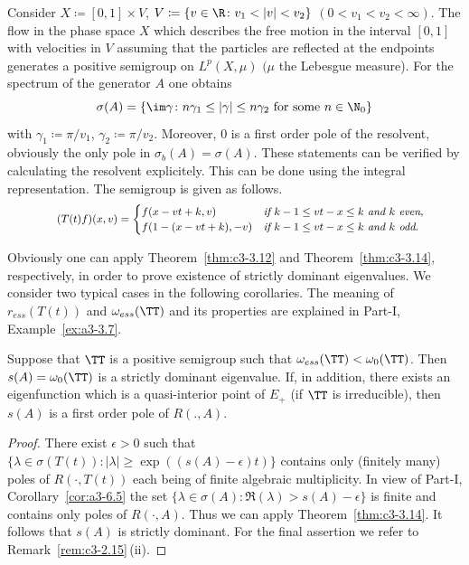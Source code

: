 \begin{example}\label{ex:c3-3.15}
	Consider $X \coloneqq  [0,1] \times V$, $V \coloneqq  \{v \in \R  \colon v_{1} < |v| < v_{2}\}$ $(0 < v_{1} < v_{2} < \infty)$. 
	The flow in the phase space $X$ which describes the free motion in the interval $[0,1]$ with velocities in $V$ assuming that the particles are reflected at the endpoints generates a positive semigroup on $L^{p}(X,\mu)$ $(\mu$ the Lebesgue measure). 
	For the spectrum of the generator $A$ one obtains 
    \[
    \sigma(A) = \{\im \gamma \colon n\gamma_{1} \leq |\gamma| \leq n\gamma_{2} \text{ for some } n \in \N_{0}\}
    \]
    with $\gamma_{1} \coloneqq  \pi/v_{1}$, $\gamma_{2} \coloneqq  \pi/v_{2}$. 
	Moreover, $0$ is a first order pole of the resolvent, obviously the only pole in $\sigma_{b}(A) = \sigma(A)$.
	These statements can be verified by calculating the resolvent explicitely. 
	This can be done using the integral representation. 
    The semigroup is given as follows.
\begin{equation}\label{eq:c3-3.20}
	\textit{\small $
	(T(t)f)(x,v) = \begin{cases}
		f(x-vt+k,v) & \text{if } k-1\leq vt-x\leq k \text{ and } k \textit{ even}, \\
		f(1-(x-vt+k),-v) & \text{if } k-1\leq vt-x\leq k \text{ and } k \text{ odd}.
	\end{cases}
$}
\end{equation} 

Obviously one can apply Theorem~\ref{thm:c3-3.12} and Theorem~\ref{thm:c3-3.14}, respectively, in order to prove existence of strictly dominant eigenvalues. 
We consider two typical cases in the following corollaries. 
The meaning of\/ $r_{ess}(T(t))$ and $\omega_{ess}(\TT)$ and its properties are explained in Part-I, Example~\ref{ex:a3-3.7}.
\end{example}

\begin{corollary}\label{cor:c3-3.16}
	Suppose that $\TT$ is a positive semigroup such that $\omega_{ess}(\TT) < \omega_0(\TT)$. 
	Then $s(A) = \omega_0(\TT)$ is a strictly dominant eigenvalue.
	If, in addition, there exists an eigenfunction which is a quasi-interior point of\/ $E_{+}$ (\eg if\/ $\TT$ is irreducible), then $s(A)$ is a first order pole of\/ $R(.,A)$.
\end{corollary}
\begin{proof}
	There exist $\epsilon > 0$ such that 
    $\{\lambda \in \sigma(T(t)) \colon |\lambda| \geq \exp((s(A)-\epsilon)t)\}$ contains only (finitely many) poles of\/ $R(\cdot,T(t))$ each being of finite algebraic multiplicity. 
	In view of Part-I, Corollary~\ref{cor:a3-6.5} the set $\{\lambda \in \sigma(A) \colon \Re(\lambda) > s(A)-\epsilon\}$ is finite and contains only poles of\/ $R(\cdot,A)$. 
	Thus we can apply Theorem~\ref{thm:c3-3.14}. 
	It follows that $s(A)$ is strictly dominant.
	For the final assertion we refer to Remark~\ref{rem:c3-2.15}\,(ii).
\end{proof}

